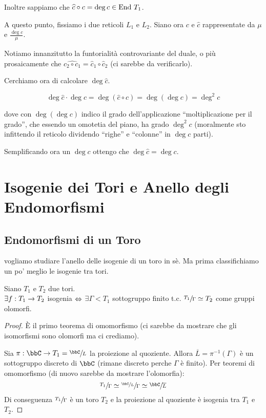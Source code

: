 	Inoltre sappiamo che $\widehat c \circ c = \deg c \in \mbox{End } T_1$.

	A questo punto, fissiamo i due reticoli $L_1$ e $L_2$. Siano ora $c$ e $\hat c$ rappresentate da $\mu$ e $\frac{\deg c}\mu$.

	Notiamo innanzitutto la funtorialità controvariante del duale, o più prosaicamente che $\hat{c_2 \circ c_1} = \hat c_1 \circ \hat c_2$ (ci sarebbe da verificarlo).

	Cerchiamo ora di calcolare $\deg \hat c$.

	\[
		\deg \hat c \cdot \deg c = \deg(\hat c \circ c) = \deg(\deg c) = \deg^2 c
	\]

	dove con $\deg(\deg c)$ indico il grado dell'applicazione ``moltiplicazione per il grado'', che essendo un omotetia del piano, ha grado $\deg^2 c$ (moralmente sto infittendo il reticolo dividendo ``righe'' e ``colonne'' in $\deg c$ parti).

	Semplificando ora un $\deg c$ ottengo che $\deg \hat c = \deg c$.


    \chapter{Isogenie dei Tori e Anello degli Endomorfismi}





    \section{Endomorfismi di un Toro}
     vogliamo studiare l'anello delle isogenie di un toro in sè. Ma prima classifichiamo un po' meglio le isogenie tra tori.

    \begin{proposizione}
    Siano $T_{1}$ e $T_{2}$ due tori.\\
    $\exists f:T_{1} \rightarrow T_{2}$ isogenia $\Leftrightarrow$ $\exists \Gamma < T_{1}$ sottogruppo finito t.c. $\sfrac{T_{1}}{\Gamma} \simeq T_{2}$ come gruppi olomorfi.
    \end{proposizione}
    \begin{proof}
      \fbox{$\Rar$} È il primo teorema di omomorfismo (ci sarebbe da mostrare che gli isomorfismi sono olomorfi ma ci crediamo).

      \fbox{$\Leftarrow$} Sia $\pi:\bbC \rar T_{1} = \sfrac{\bbC}{L}$ la proiezione al quoziente. Allora $\overline{L}=\pi^{-1}(\Gamma)$ è un sottogruppo discreto di $\bbC$ (rimane discreto perche $\Gamma$ è finito). Per teoremi di omomorfismo (di nuovo sarebbe da mostrare l'olomorfia):
    $$\sfrac{T_{1}}{\Gamma} \simeq \sfrac{\sfrac{\bbC}{L}}{\Gamma} \simeq \sfrac{\bbC}{\overline{L}}$$
    Di conseguenza $\sfrac{T_{1}}{\Gamma}$ è un toro $T_{2}$ e la proiezione al quoziente è isogenia tra $T_{1}$ e $T_{2}$.
    \end{proof}


